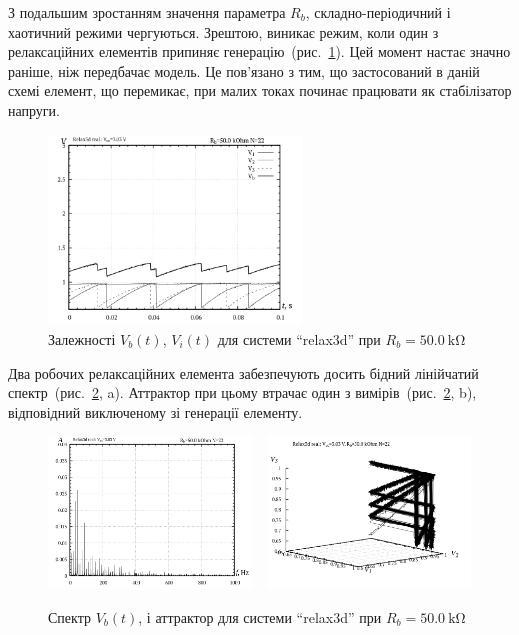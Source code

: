 З подальшим зростанням значення параметра
$R_b$, складно-періодичний і хаотичний режими чергуються. Зрештою,
виникає режим, коли один з релаксаційних елементів припиняє
генерацію~(рис.~\ref{atu:f:relax3d_t_22}). Цей момент настає значно раніше,
ніж передбачає модель. Це пов'язано з тим, що застосований в даній
схемі елемент, що перемикає, при малих токах починає працювати
як стабілізатор напруги.

\begin{figure}[htb!]
  \centerline{\includegraphics[width=0.6\textwidth]{p/relax3d_t_22.png} }
\caption{Залежності $ V_b (t) $, $ V_i (t) $ для системи ``relax3d'' при $ R_b = \SI{50.0}{\kilo \ohm} $}
\label{atu:f:relax3d_t_22}
\end{figure}

Два робочих релаксаційних елемента забезпечують досить
бідний лінійчатий спектр~(рис.~\ref{atu:f:relax3d_f_22}, a). Аттрактор при
цьому втрачає один з вимірів~(рис.~\ref{atu:f:relax3d_f_22}, b), відповідний
виключеному зі генерації елементу.

\begin{figure}[htb!]
  \centerline{
    \includegraphics[width=0.48\textwidth]{p/relax3d_f_22.png}
    ~
    \includegraphics[width=0.48\textwidth]{p/relax3d_v1v2v3_22.png}
  }
\caption{Спектр $ V_b (t) $, і аттрактор для системи ``relax3d'' при $ R_b = \SI{50.0}{\kilo \ohm} $}
\label{atu:f:relax3d_f_22}
\end{figure}

